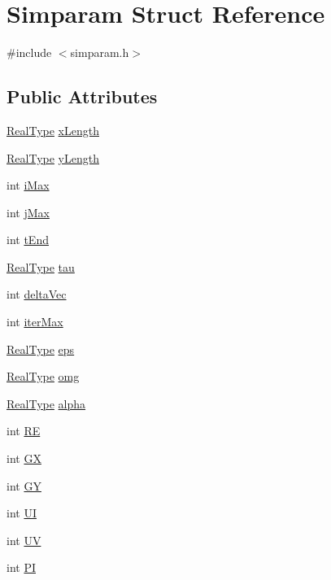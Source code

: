 \hypertarget{struct_simparam}{\section{Simparam Struct Reference}
\label{d6/d1d/struct_simparam}
}


{\ttfamily \#include $<$simparam.\-h$>$}

\subsection*{Public Attributes}
\begin{DoxyCompactItemize}
\item 
\hyperlink{typedef_8h_a4071869abd34c628c23e249413e815cf}{Real\-Type} \hyperlink{struct_simparam_a1e96889e108dde9f48978aa8f7c9027c}{x\-Length}
\item 
\hyperlink{typedef_8h_a4071869abd34c628c23e249413e815cf}{Real\-Type} \hyperlink{struct_simparam_a065ce904080ea0361eae98124c86ffab}{y\-Length}
\item 
int \hyperlink{struct_simparam_a5f7e2ae23f38be14f693fb437058cdf5}{i\-Max}
\item 
int \hyperlink{struct_simparam_ae52e9540a64a6e419554a7ebd77df83b}{j\-Max}
\item 
int \hyperlink{struct_simparam_a7fd229effd7842736783206b9f54707d}{t\-End}
\item 
\hyperlink{typedef_8h_a4071869abd34c628c23e249413e815cf}{Real\-Type} \hyperlink{struct_simparam_a09890730b950ccbd5df07ec0a6e7e0c5}{tau}
\item 
int \hyperlink{struct_simparam_a695c2c299b4c8a474fdb76a85efdff81}{delta\-Vec}
\item 
int \hyperlink{struct_simparam_a0a20db5558bc0fc25e3431e04171312c}{iter\-Max}
\item 
\hyperlink{typedef_8h_a4071869abd34c628c23e249413e815cf}{Real\-Type} \hyperlink{struct_simparam_a8a477452247ad55e2d9ba2ad71cad937}{eps}
\item 
\hyperlink{typedef_8h_a4071869abd34c628c23e249413e815cf}{Real\-Type} \hyperlink{struct_simparam_a4097676bbe9c22c0d591d0a38a92db1f}{omg}
\item 
\hyperlink{typedef_8h_a4071869abd34c628c23e249413e815cf}{Real\-Type} \hyperlink{struct_simparam_a4dd0e3b3cd66c2b3ae18df07f28ea2b5}{alpha}
\item 
int \hyperlink{struct_simparam_accc52cec0d22d7d80d8702127b4b896a}{R\-E}
\item 
int \hyperlink{struct_simparam_a59d3dcbf5156cb45608696f7f1d39393}{G\-X}
\item 
int \hyperlink{struct_simparam_a8eb58296cc754b83c07616efb2a0ee24}{G\-Y}
\item 
int \hyperlink{struct_simparam_a0e30f7a3b2f3017fd8432dbe0af711d5}{U\-I}
\item 
int \hyperlink{struct_simparam_a2d14ee995484c84928cd341ce35079b8}{U\-V}
\item 
int \hyperlink{struct_simparam_a1ae75207ff09bb7b8557fdccc2674e54}{P\-I}
\end{DoxyCompactItemize}


